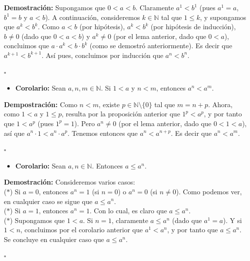\documentclass[10 pt]{article}
\begin{document}
\Large{\textbf{Demostración:} Supongamos que $0<a<b$. Claramente $a^1<b^1$ (pues $a^1=a$, $b^1=b$ y $a<b$). A continuación, consideremos $k \in \mathbb N$ tal que $1 \leq k$, y supongamos que $a^k<b^k$. Como $a<b$ (por hipótesis), $a^k<b^k$ (por hipótesis de inducción), $b \neq 0$ (dado que $0<a<b$) y $a^k \neq 0$ (por el lema anterior, dado que $0<a$), concluimos que $a \cdot a^k<b \cdot b^k$ (como se demostró anteriormente). Es decir que $a^{k+1}<b^{k+1}$. Así pues, concluimos por inducción que $a^n<b^n$.} \\

\begin{flushright}
    $\square$
\end{flushright}

\begin{itemize}
    \item \Large{\textbf{Corolario:} Sean $a,n,m \in \mathbb N$. Si $1<a$ y $n<m$, entonces $a^n<a^m$.} \\
\end{itemize}

\Large{\textbf{Dempostración:} Como $n<m$, existe $p \in \mathbb N \setminus \{0\}$ tal que $m=n+p$. Ahora, como $1<a$ y $1 \leq p$, resulta por la proposición anterior que $1^p<a^p$, y por tanto que $1<a^p$ (pues $1^p=1$). Pero $a^n \neq 0$ (por el lema anterior, dado que $0<1<a$), así que $a^n \cdot 1<a^n \cdot a^p$. Tenemos entonces que $a^n<a^{n+p}$. Es decir que $a^n<a^m$.} \\

\begin{flushright}
    $\square$
\end{flushright}

\begin{itemize}
    \item \Large{\textbf{Corolario:} Sean $a,n \in \mathbb N$. Entonces $a \leq a^n$.} \\
\end{itemize}

\Large{\textbf{Demostración:} Consideremos varios casos: \\

($\ast$) Si $a=0$, entonces $a^n=1$ (si $n=0$) o $a^n=0$ (si $n \neq 0$). Como podemos ver, en cualquier caso se sigue que $a \leq a^n$. \\

($\ast$) Si $a=1$, entonces $a^n=1$. Con lo cual, es claro que $a \leq a^n$. \\

($\ast$) Supongamos que $1<a$. Si $n=1$, claramente $a \leq a^n$ (dado que $a^1=a$). Y si $1<n$, concluimos por el corolario anterior que $a^1<a^n$, y por tanto que $a \leq a^n$. \\

Se concluye en cualquier caso que $a \leq a^n$.} \\

\begin{flushright}
    $\square$
\end{flushright}
\end{document}
